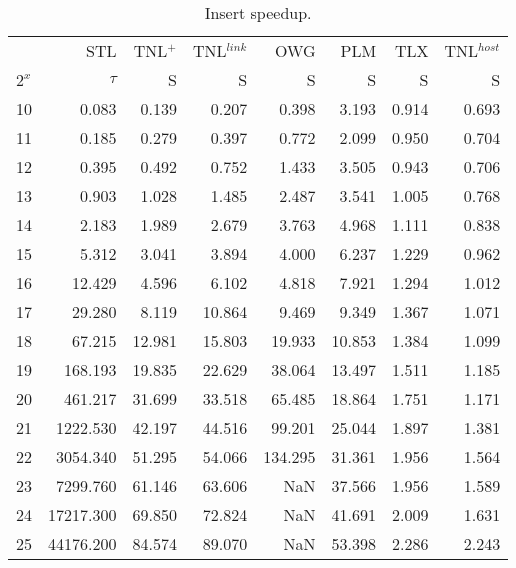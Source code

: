 \begin{table}
  \centering
  \begin{tabular}{lr|rrrrrr}
    \toprule
    {}    & STL       & TNL$^+$ & TNL$^{link}$ & OWG     & PLM    & TLX   & TNL$^{host}$ \\
    $2^x$ & $\tau$    & S       & S            & S       & S      & S     & S            \\
    \midrule
    10    & 0.083     & 0.139   & 0.207        & 0.398   & 3.193  & 0.914 & 0.693        \\
    11    & 0.185     & 0.279   & 0.397        & 0.772   & 2.099  & 0.950 & 0.704        \\
    12    & 0.395     & 0.492   & 0.752        & 1.433   & 3.505  & 0.943 & 0.706        \\
    13    & 0.903     & 1.028   & 1.485        & 2.487   & 3.541  & 1.005 & 0.768        \\
    14    & 2.183     & 1.989   & 2.679        & 3.763   & 4.968  & 1.111 & 0.838        \\
    15    & 5.312     & 3.041   & 3.894        & 4.000   & 6.237  & 1.229 & 0.962        \\
    16    & 12.429    & 4.596   & 6.102        & 4.818   & 7.921  & 1.294 & 1.012        \\
    17    & 29.280    & 8.119   & 10.864       & 9.469   & 9.349  & 1.367 & 1.071        \\
    18    & 67.215    & 12.981  & 15.803       & 19.933  & 10.853 & 1.384 & 1.099        \\
    19    & 168.193   & 19.835  & 22.629       & 38.064  & 13.497 & 1.511 & 1.185        \\
    20    & 461.217   & 31.699  & 33.518       & 65.485  & 18.864 & 1.751 & 1.171        \\
    21    & 1222.530  & 42.197  & 44.516       & 99.201  & 25.044 & 1.897 & 1.381        \\
    22    & 3054.340  & 51.295  & 54.066       & 134.295 & 31.361 & 1.956 & 1.564        \\
    23    & 7299.760  & 61.146  & 63.606       & NaN     & 37.566 & 1.956 & 1.589        \\
    24    & 17217.300 & 69.850  & 72.824       & NaN     & 41.691 & 2.009 & 1.631        \\
    25    & 44176.200 & 84.574  & 89.070       & NaN     & 53.398 & 2.286 & 2.243        \\
    \bottomrule
  \end{tabular}
  \caption{Insert speedup.}
  \label{table:insert-speedup}
\end{table}